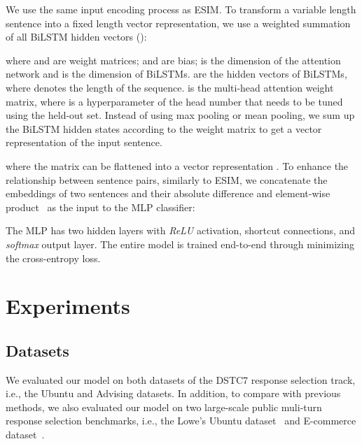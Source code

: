 \documentclass[letterpaper]{article} \usepackage{aaai19}  \usepackage{times}  \usepackage{helvet}  \usepackage{courier}  \usepackage{url}  \usepackage{graphicx}
\begin{document}
We use the same input encoding process as ESIM. To transform a variable length sentence into a fixed length vector representation, we use a weighted summation of all BiLSTM hidden vectors (): 
 
\noindent where  and  are weight matrices;  and  are bias;  is the dimension of the attention network and  is the dimension of BiLSTMs.  are the hidden vectors of BiLSTMs, where  denotes the length of the sequence.  is the multi-head attention weight matrix, where  is a hyperparameter of the head number that needs to be tuned using the held-out set. Instead of using max pooling or mean pooling, we sum up the BiLSTM hidden states  according to the weight matrix  to get a vector representation of the input sentence.
 
\noindent where the matrix  can be flattened into a vector representation . To enhance the relationship between sentence pairs, similarly to ESIM, we concatenate the embeddings of two sentences and their absolute difference and element-wise product~\cite{DBLP:conf/acl/MouMLX0YJ16} as the input to the MLP classifier:

 
The MLP has two hidden layers with \textit{ReLU} activation, shortcut connections, and \textit{softmax} output layer. The entire model is trained end-to-end through minimizing the cross-entropy loss. 

\section{Experiments}
\subsection{Datasets}
We evaluated our model on both datasets of the DSTC7 response selection track, i.e., the Ubuntu and Advising datasets. In addition, to compare with previous methods, we also evaluated our model on two large-scale public muli-turn response selection benchmarks, i.e., the Lowe's Ubuntu dataset~\cite{DBLP:conf/sigdial/LowePSP15} and E-commerce dataset~\cite{DBLP:conf/coling/ZhangLZZL18}.
\end{document}
